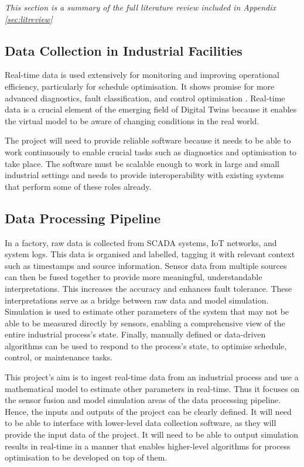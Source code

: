 \textit{This section is a summary of the full literature review included in Appendix \ref{sec:litreview}}


\subsection{Data Collection in Industrial Facilities}

Real-time data is used extensively for monitoring and improving operational efficiency, particularly for schedule optimisation. It shows promise for more advanced diagnostics, fault classification, and control optimisation \cite{udugamaRoleBigData2020}. Real-time data is a crucial element of the emerging field of Digital Twins because it enables the virtual model to be aware of changing conditions in the real world.

The project will need to provide reliable software because it needs to be able to work continuously to enable crucial tasks such as diagnostics and optimisation to take place. The software must be scalable enough to work in large and small industrial settings and needs to provide interoperability with existing systems that perform some of these roles already.


\subsection{Data Processing Pipeline}

In a factory, raw data is collected from SCADA systems, IoT networks, and system logs. 
This data is organised and labelled, tagging it with relevant context such as timestamps and source information. Sensor data from multiple sources can then be fused together to provide more meaningful, understandable interpretations. 
This increases the accuracy and enhances fault tolerance. 
These interpretations serve as a bridge between raw data and model simulation. Simulation is used to estimate other parameters of the system that may not be able to be measured directly by sensors, enabling a comprehensive view of the entire industrial process's state. 
Finally, manually defined or data-driven algorithms can be used to respond to the process's state, to optimise schedule, control, or maintenance tasks. 

This project's aim is to ingest real-time data from an industrial process and use a mathematical model to estimate other parameters in real-time. 
Thus it focuses on the sensor fusion and model simulation areas of the data processing pipeline. Hence, the inputs and outputs of the project can be clearly defined.
It will need to be able to interface with lower-level data collection software, as they will provide the input data of the project. 
It will need to be able to output simulation results in real-time in a manner that enables higher-level algorithms for process optimisation to be developed on top of them.

